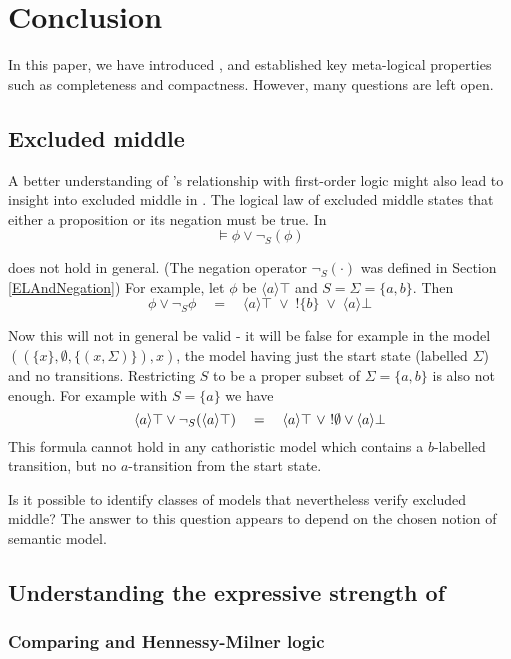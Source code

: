 \section{Conclusion}\label{conclusion}

In this paper, we have introduced \cathoristic{}, and established key
meta-logical properties such as completeness and compactness. However,
many questions are left open. 

\subsection{Excluded middle}

A better understanding of \cathoristic{}'s relationship with first-order
logic might also lead to insight into excluded middle in \cathoristic{}.
The logical law of excluded middle states that either a proposition or
its negation must be true. In \cathoristic{}
\[
\models \phi \lor \neg_S(\phi)
\]

\NI does not hold in general. (The negation operator $\neg_{S}(\cdot)$
was defined in Section \ref{ELAndNegation}) For example, let $\phi$ be
$\langle a \rangle \top$ and $S = \Sigma = \{a, b\}$.  Then
\[
   \phi \lor \neg_{S} \phi 
       \quad=\quad 
   \langle a \rangle \top \; \lor \; ! \{b\} \; \lor \; \langle a \rangle \bot
\]

\NI Now this will not in general be valid - it will be false for
example in the model $((\{x\}, \emptyset, \{(x, \Sigma)\}), x)$, the
model having just the start state (labelled $\Sigma$) and no transitions.
Restricting $S$ to be a proper subset of $\Sigma = \{a, b\}$ is also not
enough. For example with $S = \{a\}$ we have
\[
   \langle a \rangle \top \lor \neg_{S}(\langle a \rangle \top)
      \quad=\quad
   \langle a \rangle \top\ \lor\ !\emptyset \lor \langle a \rangle \bot
\]
This formula cannot hold in any cathoristic model which contains a
$b$-labelled transition, but no $a$-transition from the start state.

Is it possible to identify classes of models that nevertheless verify
excluded middle? The answer to this question appears to depend 
on the chosen notion of semantic model.

\subsection{Understanding the expressive strength of \cathoristic{}}

\subsubsection{Comparing \cathoristic{} and Hennessy-Milner logic}

